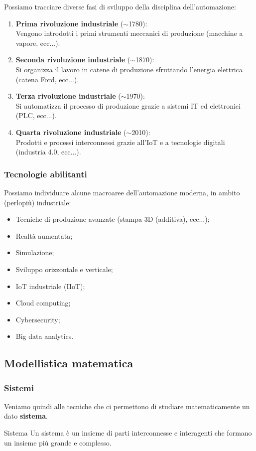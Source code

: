 \documentclass[a4paper,11pt]{article}
\begin{document}
Possiamo tracciare diverse fasi di sviluppo della disciplina dell'automazione:
\begin{enumerate}
	\item \textbf{Prima rivoluzione industriale} ($\sim$1780): \\
		Vengono introdotti i primi strumenti meccanici di produzione (macchine a vapore, ecc...).
	\item \textbf{Seconda rivoluzione industriale} ($\sim$1870): \\
		Si organizza il lavoro in catene di produzione sfruttando l'energia elettrica (catena Ford, ecc...).
	\item \textbf{Terza rivoluzione industriale} ($\sim$1970): \\ 
		Si automatizza il processo di produzione grazie a sistemi IT ed elettronici (PLC, ecc...).
	\item \textbf{Quarta rivoluzione industriale} ($\sim$2010): \\
		Prodotti e processi interconnessi grazie all'IoT e a tecnologie digitali (industria 4.0, ecc...).
\end{enumerate}

\subsubsection{Tecnologie abilitanti}
Possiamo individuare alcune macroaree dell'automazione moderna, in ambito (perlopiù) industriale:
\begin{itemize}
	\item Tecniche di produzione avanzate (stampa 3D (additiva), ecc...);
	\item Realtà aumentata;
	\item Simulazione;
	\item Sviluppo orizzontale e verticale;
	\item IoT industriale (IIoT);
	\item Cloud computing;
	\item Cybersecurity;
	\item Big data analytics.
\end{itemize}

\subsection{Modellistica matematica}
\subsubsection{Sistemi}
Veniamo quindi alle tecniche che ci permettono di studiare matematicamente un dato \textbf{sistema}.
\begin{definition}{Sistema}
	Un sistema è un insieme di parti interconnesse e interagenti che formano un insieme più grande e complesso.
\end{definition}
\end{document}

